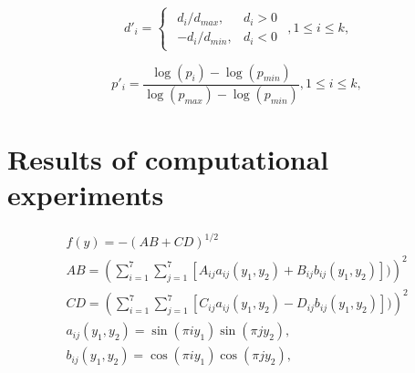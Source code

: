 \documentclass[runningheads]{llncs}
\begin{document}
\begin{equation}
    \label{eq:17}
d'_i=
\begin{cases}
  \begin{matrix}
     d_i / d_{max}, & d_i > 0 \\
     -d_i / d_{min}, & d_i < 0 
  \end{matrix}
\end{cases}, 
1 \leq i \leq k,
\end{equation}


\begin{equation}
    \label{eq:18}
p'_i= \frac{ \log (p_i) - \log (p_{min})}{ \log (p_{max}) - \log (p_{min})} , 1 \leq i \leq k,
\end{equation}


\section{Results of computational experiments}
\label{sec:5}


\begin{equation}
    \label{eq:19}
		\begin{matrix}
		  f(y)= -(AB + CD)^{1/2} \\
			AB =(\sum_{i=1}^7{\sum_{j=1}^7{[A_{ij} a_{ij} (y_1,y_2) + B_{ij} b_{ij} (y_1,y_2)])}})^2 \\
			CD =(\sum_{i=1}^7{\sum_{j=1}^7{[C_{ij} a_{ij} (y_1,y_2) - D_{ij} b_{ij} (y_1,y_2)])}})^2 \\
			a_{ij} (y_1,y_2) = \sin(\pi i y_1) \sin(\pi j y_2), \\
			b_{ij} (y_1,y_2) = \cos(\pi i y_1) \cos(\pi j y_2),
		\end{matrix}
\end{equation}



%
%
%
 
 
%
%
%
%
%
\end{document}
